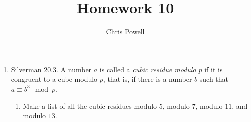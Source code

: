 \documentclass[10pt]{article}
\begin{document}
\title{\vspace{-2em}Homework 10\vspace{-1em}}
\author{Chris Powell}
\date{}
\maketitle
\thispagestyle{fancy}
\begin{enumerate}[itemsep=1em,label=\Alph*.,leftmargin=*]
    \item Silverman 20.3. A number $a$ is called a \emph{cubic residue modulo $p$} if it is congruent to a cube modulo $p$, that is, if there is a number $b$ such that $a \equiv b^3 \mod{p}$.
            \begin{enumerate}[itemsep=1em, label=(\alph*), leftmargin=*]
            \item Make a list of all the cubic residues modulo $5$, modulo $7$, modulo $11$, and modulo $13$.
            

\end{enumerate}
\end{enumerate}
\end{document}
